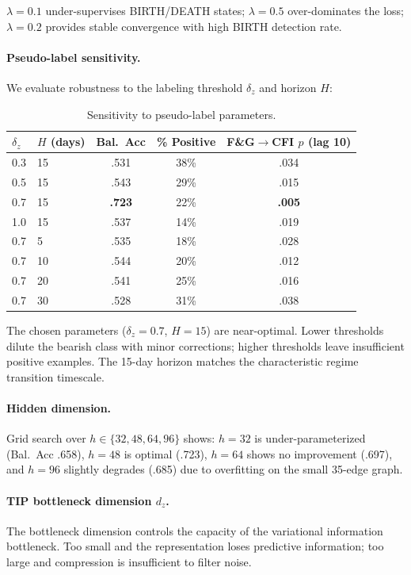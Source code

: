 \documentclass[11pt]{article}
\begin{document}
$\lambda = 0.1$ under-supervises BIRTH/DEATH states; $\lambda = 0.5$ over-dominates the loss; $\lambda = 0.2$ provides stable convergence with high BIRTH detection rate.

\paragraph{Pseudo-label sensitivity.} We evaluate robustness to the labeling threshold $\delta_z$ and horizon $H$:

\begin{table}[h]
\centering
\caption{Sensitivity to pseudo-label parameters.}
\small
\begin{tabular}{llccc}
\toprule
$\delta_z$ & $H$ (days) & Bal.\ Acc & \% Positive & F\&G$\to$CFI $p$ (lag 10) \\
\midrule
0.3 & 15 & .531 & 38\% & .034 \\
0.5 & 15 & .543 & 29\% & .015 \\
0.7 & 15 & \textbf{.723} & 22\% & \textbf{.005} \\
1.0 & 15 & .537 & 14\% & .019 \\
0.7 & 5  & .535 & 18\% & .028 \\
0.7 & 10 & .544 & 20\% & .012 \\
0.7 & 20 & .541 & 25\% & .016 \\
0.7 & 30 & .528 & 31\% & .038 \\
\bottomrule
\end{tabular}
\end{table}

The chosen parameters ($\delta_z = 0.7$, $H = 15$) are near-optimal. Lower thresholds dilute the bearish class with minor corrections; higher thresholds leave insufficient positive examples. The 15-day horizon matches the characteristic regime transition timescale.

\paragraph{Hidden dimension.} Grid search over $h \in \{32, 48, 64, 96\}$ shows: $h=32$ is under-parameterized (Bal.\ Acc .658), $h=48$ is optimal (.723), $h=64$ shows no improvement (.697), and $h=96$ slightly degrades (.685) due to overfitting on the small 35-edge graph.

\paragraph{TIP bottleneck dimension $d_z$.} The bottleneck dimension controls the capacity of the variational information bottleneck. Too small and the representation loses predictive information; too large and compression is insufficient to filter noise.
\end{document}
